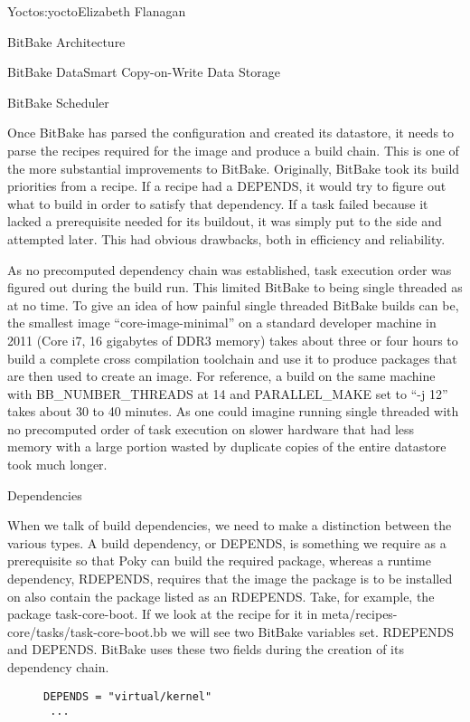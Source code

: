 \begin{aosachapter}{Yocto}{s:yocto}{Elizabeth Flanagan}
\begin{aosasect1}{BitBake Architecture}
\begin{aosasect2}{BitBake DataSmart Copy-on-Write Data Storage}
\end{aosasect2}

\begin{aosasect2}{BitBake Scheduler}

Once BitBake has parsed the configuration and created its datastore,
it needs to parse the recipes required for the image and produce a
build chain. This is one of the more substantial improvements to
BitBake. Originally, BitBake took its build priorities from a
recipe. If a recipe had a DEPENDS, it would try to figure out what to
build in order to satisfy that dependency. If a task failed because it
lacked a prerequisite needed for its buildout, it was simply put to
the side and attempted later. This had obvious drawbacks, both in
efficiency and reliability.

As no precomputed dependency chain was established, task execution
order was figured out during the build run. This limited BitBake to
being single threaded as at no time. To give an idea of how painful
single threaded BitBake builds can be, the smallest image
``core-image-minimal'' on a standard developer machine in 2011
(Core\textsuperscript{\textregistered} i7, 16 gigabytes of DDR3
memory) takes about three or four hours to build a complete cross
compilation toolchain and use it to produce packages that are then
used to create an image. For reference, a build on the same machine
with BB\_NUMBER\_THREADS at 14 and PARALLEL\_MAKE set to ``-j 12''
takes about 30 to 40 minutes. As one could imagine running single
threaded with no precomputed order of task execution on slower
hardware that had less memory with a large portion wasted by duplicate
copies of the entire datastore took much longer.

\begin{aosasect3}{Dependencies}

When we talk of build dependencies, we need to make a distinction
between the various types. A build dependency, or DEPENDS, is
something we require as a prerequisite so that Poky can build the
required package, whereas a runtime dependency, RDEPENDS, requires
that the image the package is to be installed on also contain the
package listed as an RDEPENDS. Take, for example, the package
task-core-boot. If we look at the recipe for it in
meta/recipes-core/tasks/task-core-boot.bb we will see two BitBake
variables set. RDEPENDS and DEPENDS. BitBake uses these two fields
during the creation of its dependency chain. 

\begin{figure}
\begin{verbatim}
DEPENDS = "virtual/kernel"
 ...


\end{verbatim}
\end{figure}
\end{aosasect3}
\end{aosasect2}
\end{aosasect1}
\end{aosachapter}
